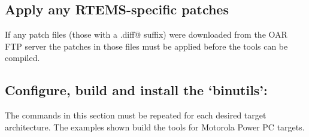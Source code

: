 \documentclass{report}
\begin{document}
\subsection {Apply any RTEMS-specific patches}
If any patch files (those with a \verb@.diff@ suffix) were downloaded
from the OAR FTP server the patches in those files must be applied before
the tools can be compiled.








\subsection {Configure, build and install the `binutils':}
The commands in this section must be repeated for each desired target
architecture.  The examples shown build the tools for Motorola Power PC targets.
\end{document}
